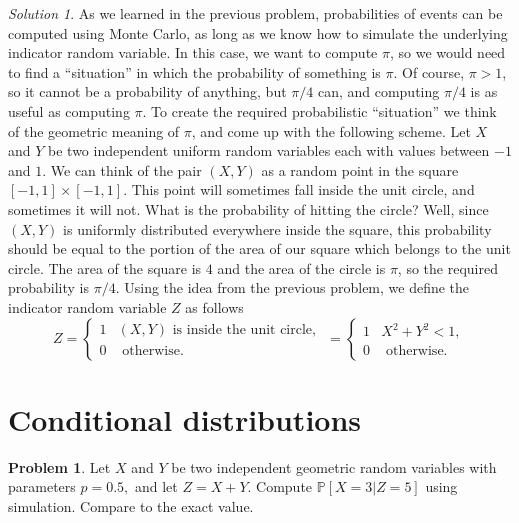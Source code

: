 \documentclass[
]{book}
\theoremstyle{definition}
\theoremstyle{definition}
\theoremstyle{definition}
\newtheorem{exercise}{Problem}[chapter]
\theoremstyle{definition}
\theoremstyle{remark}
\newtheorem*{solution}{Solution}
\begin{document}
\begin{solution}
As we learned in the previous problem, probabilities of events can be computed using Monte Carlo, as long as we know how to simulate the underlying indicator random variable. In this case, we want to compute \(\pi\), so we would need to find a ``situation'' in which the probability of something is \(\pi\). Of course, \(\pi>1\), so it cannot be a probability of anything, but \(\pi/4\) can, and computing \(\pi/4\) is as useful as computing \(\pi\). To create the required probabilistic ``situation'' we think of the geometric meaning of \(\pi\), and come up with the following scheme. Let \(X\) and \(Y\) be two independent uniform random variables each with values between \(-1\) and \(1\). We can think of the pair \((X,Y)\) as a random point in the square \([-1,1]\times [-1,1]\). This point will sometimes fall inside the unit circle, and sometimes it will not. What is the probability of hitting the circle? Well, since \((X,Y)\) is uniformly distributed everywhere inside the square, this probability should be equal to the portion of the area of our square which belongs to the unit circle. The area of the square is \(4\) and the area of the circle is \(\pi\), so the required probability is \(\pi/4\). Using the idea from the previous problem, we define the indicator random variable \(Z\) as follows
\[ Z = \begin{cases} 1 & (X,Y) \text{ is inside the unit circle, } \\ 0 & \text{ otherwise.}
\end{cases}
= \begin{cases} 1& X^2+Y^2 < 1, \\ 0 & \text{ otherwise.} \end{cases}\]
\end{solution}

\hypertarget{conditional-distributions}{%
\section{Conditional distributions}\label{conditional-distributions}}

\begin{exercise}
Let \(X\) and \(Y\) be two independent geometric random variables with parameters \(p=0.5,\) and let \(Z=X+Y\). Compute \({\mathbb{P}}[ X = 3| Z = 5]\) using simulation. Compare to the exact value.
\end{exercise}
\end{document}
